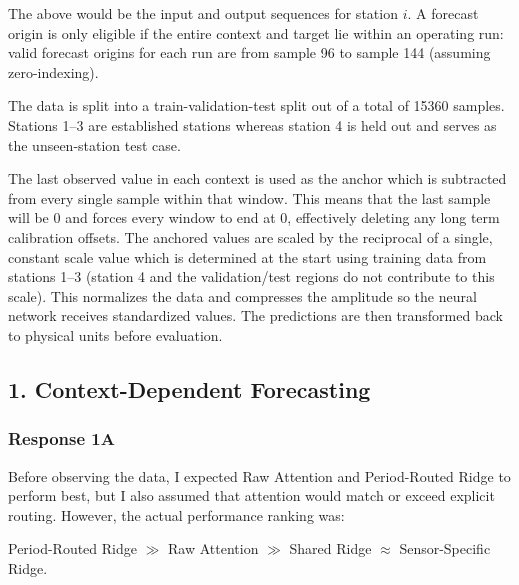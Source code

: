 \documentclass[11pt, a4paper]{article}
\begin{document}
The above would be the input and output sequences for station $i$. A forecast origin is only eligible if the entire context and target lie within an operating run: valid forecast origins for each run are from sample 96 to sample 144 (assuming zero-indexing).

The data is split into a train-validation-test split out of a total of 15360 samples. Stations 1--3 are established stations whereas station 4 is held out and serves as the unseen-station test case.

The last observed value in each context is used as the anchor which is subtracted from every single sample within that window. This means that the last sample will be 0 and forces every window to end at 0, effectively deleting any long term calibration offsets. The anchored values are scaled by the reciprocal of a single, constant scale value which is determined at the start using training data from stations 1--3 (station 4 and the validation/test regions do not contribute to this scale). This normalizes the data and compresses the amplitude so the neural network receives standardized values. The predictions are then transformed back to physical units before evaluation.

\subsection*{1. Context-Dependent Forecasting}

\subsubsection*{Response 1A}

Before observing the data, I expected Raw Attention and Period-Routed Ridge to perform best, but I also assumed that attention would match or exceed explicit routing. However, the actual performance ranking was: 
\begin{center}
  Period-Routed Ridge $\gg$ Raw Attention $\gg$ Shared Ridge $\approx$ Sensor-Specific Ridge.
\end{center}
\end{document}
